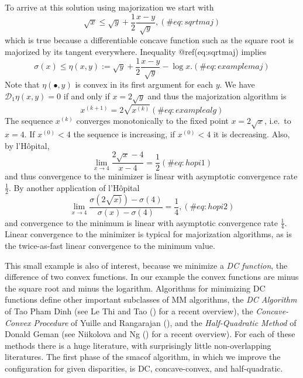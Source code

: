 \documentclass[
  12pt,
  letterpaper,
  DIV=11,
  numbers=noendperiod]{scrartcl}
\theoremstyle{plain}
\theoremstyle{remark}
\begin{document}
To arrive at this solution using majorization we start with
\begin{equation}
\sqrt{x}\leq\sqrt{y}+\frac12\frac{x-y}{\sqrt{y}},
(\#eq:sqrtmaj)
\end{equation} which is true because a differentiable concave function
such as the square root is majorized by its tangent everywhere.
Inequality @ref(eq:sqrtmaj) implies \begin{equation}
\sigma(x)\leq\eta(x,y):=\sqrt{y}+\frac12\frac{x-y}{\sqrt{y}}-\log{x}.
(\#eq:examplemaj)
\end{equation} Note that \(\eta(\bullet,y)\) is convex in its first
argument for each \(y\). We have \(\mathcal{D}_1\eta(x,y)=0\) if and
only if \(x=2\sqrt{y}\) and thus the majorization algorithm is
\begin{equation}
x^{(k+1)}=2\sqrt{x^{(k)}}
(\#eq:examplealg)
\end{equation} The sequence \(x^{(k)}\) converges monotonically to the
fixed point \(x=2\sqrt{x}\), i.e.~to \(x=4\). If \(x^{(0)}<4\) the
sequence is increasing, if \(x^{(0)}<4\) it is decreasing. Also, by
l'Hôpital, \begin{equation}
\lim_{x\rightarrow 4}\frac{2\sqrt{x}-4}{x-4}=\frac12
(\#eq:hopi1)
\end{equation} and thus convergence to the minimizer is linear with
asymptotic convergence rate \(\frac12\). By another application of
l'Hôpital \begin{equation}
\lim_{x\rightarrow 4}\frac{\sigma(2\sqrt{x)})-\sigma(4)}{\sigma(x)-\sigma(4)}=\frac14,
(\#eq:hopi2)
\end{equation} and convergence to the minimum is linear with asymptotic
convergence rate \(\frac14\). Linear convergence to the minimizer is
typical for majorization algorithms, as is the twice-as-fast linear
convergence to the minimum value.

This small example is also of interest, because we minimize a \emph{DC
function}, the difference of two convex functions. In our example the
convex functions are minus the square root and minus the logarithm.
Algorithms for minimizing DC functions define other important subclasses
of MM algorithms, the \emph{DC Algorithm} of Tao Pham Dinh (see Le Thi
and Tao () for a recent overview), the
\emph{Concave-Convex Procedure} of Yuille and Rangarajan
(), and the
\emph{Half-Quadratic Method} of Donald Geman (see Niikolova and Ng
() for a recent overview). For each
of these methods there is a huge literature, with surprisingly little
non-overlapping literatures. The first phase of the smacof algorithm, in
which we improve the configuration for given disparities, is DC,
concave-convex, and half-quadratic.
\end{document}
